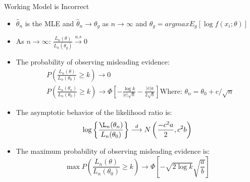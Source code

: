 \documentclass[avery5388,grid,frame]{flashcards}
\begin{document}
\begin{flashcard}{Working Model is Incorrect}
\footnotesize{\begin{itemize}
\item $\hat{\theta}_n$ is the MLE and $\hat{\theta}_n\rightarrow \theta_g$ as $n\rightarrow \infty$ and $\theta_g=argmaxE_g[\log f(x_i;\theta)]$
\item As $n\rightarrow\infty$:
 $\frac{L_n(\theta)}{L_n(\theta_g)}\overset{a.s}{\longrightarrow}0$
\item The probability of observing misleading evidence:
{\begin{align*}
&P\left(\frac{L_n(\theta)}{L_n(\theta_0)}\geq k\right)\rightarrow 0\\
&P\left(\frac{L_n(\theta_n)}{L_n(\theta_0)}\geq k\right)\rightarrow \Phi\left[-\frac{\log k}{|c|\sqrt{b}}-\frac{|c|a}{2\sqrt{b}}\right] \textrm{Where: }\theta_n=\theta_0+c/\sqrt{n}
\end{align*}}
\item The asymptotic behavior of the likelihood ratio is:
\begin{equation*}
\log\left\{\frac{\L_n(\theta_n)}{L_n(\theta_0)}\right\}\overset{d}{\longrightarrow}N\left(\frac{-c^2a}{2},c^2b\right)
\end{equation*}
\item The maximum probability of observing misleading evidence is:
\begin{equation*}
\max P\left(\frac{L_n(\theta)}{L_n(\theta_0)}\geq k\right)\rightarrow \Phi\left[-\sqrt{2\log k}\sqrt{\frac{a}{b}}\right]
\end{equation*}
\end{itemize}}
\end{flashcard}
\end{document}

